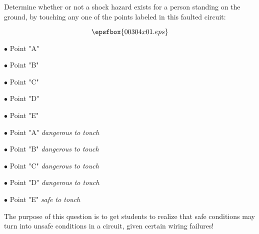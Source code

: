 

Determine whether or not a shock hazard exists for a person standing on the ground, by touching any one of the points labeled in this faulted circuit:

$$\epsfbox{00304x01.eps}$$

\medskip
\item{$\bullet$} Point "A"
\item{$\bullet$} Point "B"
\item{$\bullet$} Point "C"
\item{$\bullet$} Point "D"
\item{$\bullet$} Point "E"
\medskip







\medskip
\item{$\bullet$} Point "A" {\it dangerous to touch}
\item{$\bullet$} Point "B" {\it dangerous to touch}
\item{$\bullet$} Point "C" {\it dangerous to touch}
\item{$\bullet$} Point "D" {\it dangerous to touch}
\item{$\bullet$} Point "E" {\it safe to touch}
\medskip







The purpose of this question is to get students to realize that safe conditions may turn into unsafe conditions in a circuit, given certain wiring failures!





